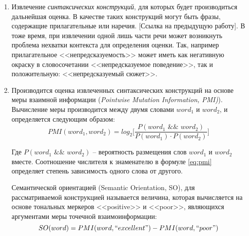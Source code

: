        \begin{enumerate}
            \item Извлечение {\it синтаксических конструкций}, для которых будет производиться
                дальнейшая оценка. В качестве таких конструкций могут быть фразы, содержащие
                прилагательные или наречия. [Ссылка на предыдущую работу]. В тоже время,
                при извлечении одной лишь части речи может возникнуть проблема нехватки контекста
                для определения оценки. Так, например прилагательное <<непредсказуемость>>
                может иметь как негативную окраску в словосочетании <<непредсказуемое поведение>>,
                так и положительную: <<непредсказуемый сюжет>>.
            \item Производится оценка извлеченных синтаксических конструкций на основе
                меры взаимной информации ({\it Pointwise Mutation Information, PMI)}).
                Вычисление меры производится между двумя словами $word_1$ и $word_2$,
                и определяется следующим образом:
                \begin{equation}
                    \label{eq:pmi}
                    PMI(word_1, word_2) = log_2 \Bigg[ \dfrac{P(word_1 \hspace{4pt} \&\& \hspace{4pt} word_2)}{P(word_1) \cdot P(word_2)} \Bigg]
                \end{equation}

                Где $P(word_1 \hspace{4pt} \&\& \hspace{4pt} word_2)$ -- вероятность
                размещения слов $word_1$ и $word_2$ вместе. Соотношение числителя
                к знаменателю в формуле \ref{eq:pmi} определяет степень зависимость одного
                слова от другого.

                Семантической ориентацией (Semantic Orientation, SO), для рассматриваемой
                конструкцией называется величина, которая вычисляется на основе
                тональных меркеров <<positive>> и <<poor>>, являющихся аргументами
                меры точечной взаимоинформации:
                \begin{equation}
                    \label{eq:so}
                    SO(word) = PMI(word, ``excellent\text{''}) - PMI(word, ``poor\text{''})
                \end{equation}


\end{enumerate}
